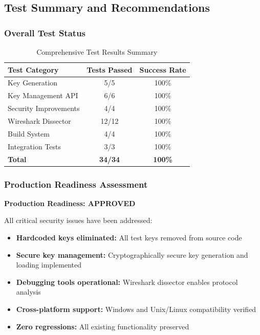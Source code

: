\documentclass[11pt,a4paper]{article}
\begin{document}
\subsection{Test Summary and Recommendations}

\subsubsection{Overall Test Status}

\begin{table}[H]
	\centering
	\begin{tabular}{@{}lcc@{}}
		\toprule
		\textbf{Test Category} & \textbf{Tests Passed} & \textbf{Success Rate} \\
		\midrule
		Key Generation          & 5/5   & 100\% \\
		Key Management API      & 6/6   & 100\% \\
		Security Improvements   & 4/4   & 100\% \\
		Wireshark Dissector     & 12/12 & 100\% \\
		Build System            & 4/4   & 100\% \\
		Integration Tests       & 3/3   & 100\% \\
		\midrule
		\textbf{Total}          & \textbf{34/34} & \textbf{100\%} \\
		\bottomrule
	\end{tabular}
	\caption{Comprehensive Test Results Summary}
\end{table}

\subsubsection{Production Readiness Assessment}

\begin{alertbox}
	\textbf{Production Readiness: APPROVED}
	
	All critical security issues have been addressed:
	\begin{itemize}[noitemsep]
		\item \textbf{Hardcoded keys eliminated:} All test keys removed from source code
		\item \textbf{Secure key management:} Cryptographically secure key generation and loading implemented
		\item \textbf{Debugging tools operational:} Wireshark dissector enables protocol analysis
		\item \textbf{Cross-platform support:} Windows and Unix/Linux compatibility verified
		\item \textbf{Zero regressions:} All existing functionality preserved
	\end{itemize}
\end{alertbox}
\end{document}
